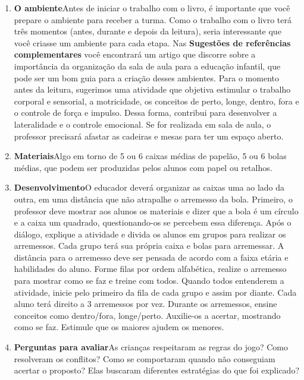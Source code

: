 \documentclass[11pt]{extarticle}
\begin{document}
\begin{enumerate}
\item \textbf{O ambiente}\quad Antes de iniciar o trabalho com o livro, é importante que você 
prepare o ambiente para receber a turma. Como o trabalho com o livro terá 
três momentos (antes, durante e depois da leitura), seria interessante que você 
criasse um ambiente para cada etapa. Nas \textbf{Sugestões de referências complementares} 
você encontrará um artigo que discorre sobre a importância da organização da sala 
de aula para a educação infantil, que pode ser um bom guia para a criação desses 
ambientes.
Para o momento antes da leitura, sugerimos uma atividade que objetiva estimular o trabalho corporal e sensorial, a motricidade, os conceitos de perto, longe, dentro, fora e o controle de força e impulso. Dessa forma, contribui para desenvolver a lateralidade e o controle emocional. Se for realizada em sala de aula, o professor precisará afastar as cadeiras e mesas para ter um espaço aberto. 

\item \textbf{Materiais}\quad Algo em torno de 5 ou 6 caixas médias de papelão, 5 ou 6 bolas médias, que podem ser produzidas pelos alunos com papel ou retalhos.

\item \textbf{Desenvolvimento}\quad O educador deverá organizar as caixas uma ao lado da outra, em uma distância que não atrapalhe o arremesso da bola. Primeiro, o professor deve mostrar aos alunos os materiais e dizer que a bola é um círculo e a caixa um quadrado, questionando-os se percebem essa diferença. Após o diálogo, explique a atividade e divida  os alunos em grupos para realizar os arremessos. Cada grupo terá sua própria caixa e bolas para arremessar. A distância para o arremesso deve ser pensada de acordo com a faixa etária e habilidades do aluno. Forme filas por ordem alfabética, realize o arremesso para mostrar como se faz e treine com todos. Quando todos entenderem a atividade, inicie pelo primeiro da fila de cada grupo e assim por diante. Cada aluno terá direito a 3 arremessos por vez. Durante os arremessos, ensine conceitos como dentro/fora, longe/perto. Auxilie-os a acertar, mostrando como se faz. Estimule que os maiores ajudem os menores. 

\item \textbf{Perguntas para avaliar}\quad As crianças respeitaram as regras do jogo? Como resolveram os conflitos? Como se comportaram quando não conseguiam acertar o proposto? Elas buscaram diferentes estratégias do que foi explicado? 

\end{enumerate}
\end{document}

